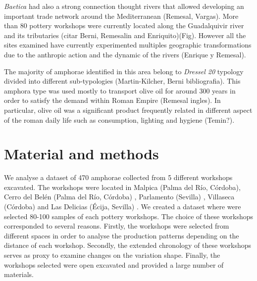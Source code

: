 \documentclass[review]{elsarticle}
\begin{document}
\emph{Baetica} had also a strong connection thought rivers that allowed developing an important trade network around the Mediterranean (Remesal, Vargas). More than 80 pottery workshops were currently located along the Guadalquivir river and its tributaries (citar Berni, Remesalin and Enriquito)(Fig). However all the sites examined have currently experimented multiples geographic transformations due to the anthropic action and the dynamic of the rivers (Enrique y Remesal). 


The majority of amphorae identified in this area belong to \emph{Dressel 20} typology divided into different sub-typologies (Martin-Kilcher, Berni bibliografia). This amphora type was used mostly to transport olive oil for around 300 years in order to satisfy the demand within Roman Empire (Remesal ingles). In particular, olive oil was a significant product frequently related in different aspect of the roman daily life such as consumption, lighting and hygiene (Temin?).




\section{Material and methods}

We analyse a dataset of 470 amphorae collected from 5 different workshops excavated. The workshops were located in Malpica (Palma del R\'io, C\'ordoba), Cerro del Bel\'en (Palma del R\'io, C\'ordoba) \citep{diaz_trujillo_excavacion_1992}, Parlamento (Sevilla) \citep{garcia_vargas_anforas_2000}, Villaseca (C\'ordoba) and Las Delicias (\'Ecija, Sevilla) \citep{fernandez_excavacion_2001,_atelier_2014} . We created a dataset where were selected 80-100 samples of each pottery workshops. The choice of these workshops corresponded to several reasons. Firstly, the workshops were selected from different spaces in order to analyse the production patterns depending on the distance of each workshop. Secondly, the extended chronology of these workshops serves as proxy to examine changes on the variation shape. Finally, the workshops selected were open excavated and provided a large number of materials.   
\end{document}
